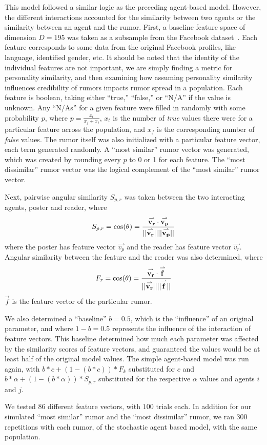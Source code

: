 This model followed a similar logic as the preceding agent-based model.
However, the different interactions accounted for the similarity between two agents or the similarity between an agent and the rumor.
First, a baseline feature space of dimension $ D = 195 $ was taken as a subsample from the Facebook dataset~\cite{mcauley-2014}.
Each feature corresponds to some data from the original Facebook profiles, like language, identified gender, etc.
It should be noted that the identity of the individual features are not important, we are simply finding a metric for personality similarity, and then examining how assuming personality similarity influences credibility of rumors impacts rumor spread in a population.
Each feature is boolean, taking either ``true,'' ``false,'' or ``N/A'' if the value is unknown.
Any ``N/As'' for a given feature were filled in randomly with some probability $ p $, where $ p = \frac{x_{t}}{x_{f} + x_{t}} $, $ x_{t} $ is the number of \textit{true} values there were for a particular feature across the population, and $ x_{f} $ is the corresponding number of \textit{false} values.
The rumor itself was also initialized with a particular feature vector, each term generated randomly.
A ``most similar'' rumor vector was generated, which was created by rounding every $ p $ to 0 or 1 for each feature.
The ``most dissimilar'' rumor vector was the logical complement of the ``most similar'' rumor vector.

Next, pairwise angular similarity $ S_{p,r} $ was taken between the two interacting agents, poster and reader, where
$$ S_{p,r} = \cos(\theta) = \frac{\overset{\rightharpoonup}{\mathbf{v_r}}\cdot\overset{\rightharpoonup}{\mathbf{v_p}}}{\lvert\lvert \overset{\rightharpoonup}{\mathbf{v_r}} \rvert\rvert \lvert\lvert \overset{\rightharpoonup}{\mathbf{v_p}} \rvert\rvert} $$ where the poster has feature vector $ \vec{v_p} $ and the reader has feature vector $ \vec{v_r} $.
Angular similarity between the feature and the reader was also determined, where $$ F_r = \cos(\theta) = \frac{\overset{\rightharpoonup}{\mathbf{v_r}}\cdot\overset{\rightharpoonup}{\mathbf{f}}}{\lvert\lvert \overset{\rightharpoonup}{\mathbf{v_r}} \rvert\rvert \lvert\lvert \overset{\rightharpoonup}{\mathbf{f}} \rvert\rvert} $$ $ \vec{f} $ is the feature vector of the particular rumor.

We also determined a ``baseline'' $ b = 0.5 $, which is the ``influence'' of an original parameter, and where $ 1 - b = 0.5 $ represents the influence of the interaction of feature vectors.
This baseline determined how much each parameter was affected by the similarity scores of feature vectors, and guaranteed the values would be at least half of the original model values.
The simple agent-based model was run again, with $ b*c + (1-(b*c))*F_k $ substituted for $ c $ and $ b*\alpha + (1-(b*\alpha))*S_{p,r} $ substituted for the respective $ \alpha $ values and agents $ i $ and $ j $.

We tested $ 86 $ different feature vectors, with $ 100 $ trials each.
In addition for our simulated ``most similar'' rumor and the ``most dissimilar'' rumor, we ran $ 300 $ repetitions with each rumor, of the stochastic agent based model, with the same population.
